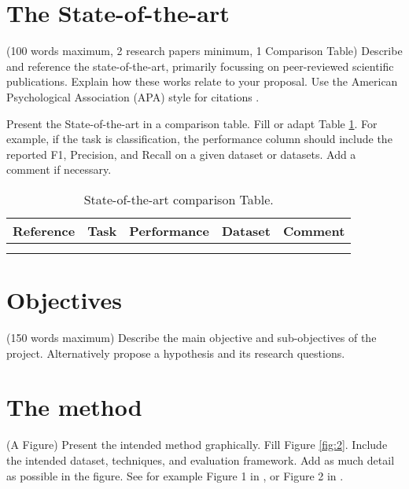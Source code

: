 \documentclass[11pt,a4paper]{article}
\begin{document}
\section{The State-of-the-art}
({\color{blue}100 words maximum, 2 research papers minimum, 1 Comparison Table}) Describe and reference the state-of-the-art, primarily focussing on peer-reviewed scientific publications. Explain how these works relate to your proposal. Use the American Psychological Association (APA) style for citations .

Present the State-of-the-art in a comparison table. Fill or adapt Table \ref{table:1}. For example, if the task is classification, the performance column should include the reported F1, Precision, and Recall on a given dataset or datasets. Add a comment if necessary.

\begin{table}[]
\centering
\begin{tabular}{|l|l|l|l|l|}
\hline
\textbf{Reference} & \textbf{Task} & \textbf{Performance} & \textbf{Dataset} & \textbf{Comment} \\ \hline
                   &               &                      &                  &                  \\ \hline
                   &               &                      &                  &                  \\ \hline
\end{tabular}
\caption{State-of-the-art comparison Table.}
\label{table:1}

\end{table}

\section{Objectives}
({\color{blue}150 words maximum}) Describe the main objective and sub-objectives of the project. Alternatively propose a hypothesis and its research questions. 

\section{The method}
({\color{blue}A Figure}) Present the intended method graphically. Fill Figure \ref{fig:2}. Include the intended dataset, techniques, and evaluation framework. Add as much detail as possible in the figure. See for example Figure 1 in , or Figure 2 in .
\end{document}

